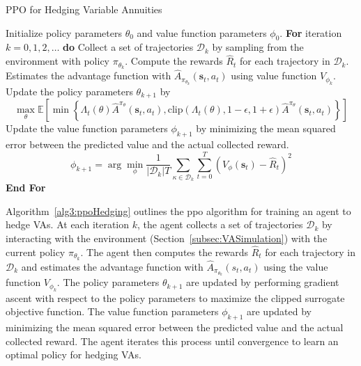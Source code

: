 \begin{algorithm} 
    \caption{PPO for Hedging Variable Annuities} 
    \begin{algorithmic}[1] \label{alg3:ppoHedging}
        \STATE  Initialize policy parameters $\theta_0$ and value function parameters $\phi_0$.
        \STATE  \textbf{For} {iteration $k=0, 1,2,\ldots$} \textbf{do}
        \STATE  \quad Collect a set of trajectories $\mathcal{D}_k$ by sampling from the environment with policy $\pi_{\theta_{k}}$.
        \STATE  \quad Compute the rewards $\hat{R}_t$ for each trajectory in $\mathcal{D}_k$.
        \STATE  \quad Estimates the advantage function with $\hat{A}_{\pi_{\theta_k}}(\mathbf{s}_t, a_t)$ using value function $V_{\phi_k}$.
        \STATE  \quad Update the policy parameters $\theta_{k+1}$ by 
        \begin{equation*}
            \max_{\theta} \mathbb{E}\left[ \min \left\{ \Lambda_t(\theta)\hat{A}^{\pi_{\theta}}(\mathbf{s}_t, a_t), \text{clip}(\Lambda_t(\theta), 1-\epsilon, 1 + \epsilon) \hat{A}^{\pi_{\theta}}(\mathbf{s}_t, a_t)  \right\} \right]
        \end{equation*}
        \STATE  \quad Update the value function parameters $\phi_{k+1}$ by minimizing the mean squared error between the predicted value and the actual collected reward.
        \begin{equation*}
            \phi_{k+1} = \arg \min_{\phi} \frac{1}{|\mathcal{D}_k|T} \sum_{\mathcal{\kappa} \in \mathcal{D}_k} \sum_{t=0}^{T} \left( V_{\phi}(\mathbf{s}_t) - \hat{R}_t \right)^2
        \end{equation*}
        \STATE  \textbf{End For}
    \end{algorithmic}
\end{algorithm}

Algorithm~\ref{alg3:ppoHedging} outlines the \gls{ppo} algorithm for training an agent to hedge VAs.
At each iteration $k$, the agent collects a set of trajectories $\mathcal{D}_k$ by interacting with the environment (Section~\ref{subsec:VASimulation}) with the current policy $\pi_{\theta_k}$.
The agent then computes the rewards $\hat{R}_t$ for each trajectory in $\mathcal{D}_k$ and estimates the advantage function with $\hat{A}_{\pi_{\theta_k}}(s_t, a_t)$ using the value function $V_{\phi_k}$.
The policy parameters $\theta_{k+1}$ are updated by performing gradient ascent with respect to the policy parameters to maximize the clipped surrogate objective function.
The value function parameters $\phi_{k+1}$ are updated by minimizing the mean squared error between the predicted value and the actual collected reward.
The agent iterates this process until convergence to learn an optimal policy for hedging VAs.

